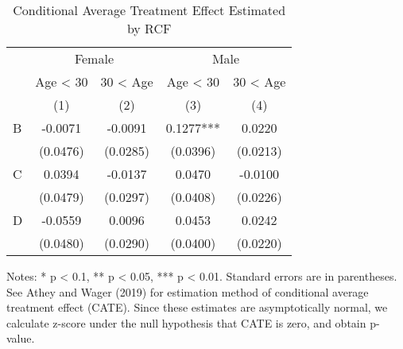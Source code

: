 \documentclass[
]{article}
\begin{document}
\begin{table}[H]

\caption{\label{tab:rcf-int-cate}Conditional Average Treatment Effect Estimated by RCF}
\centering
\fontsize{9}{11}\selectfont
\begin{threeparttable}
\begin{tabular}[t]{lcccc}
\toprule
\multicolumn{1}{c}{ } & \multicolumn{2}{c}{Female} & \multicolumn{2}{c}{Male} \\
\cmidrule(l{3pt}r{3pt}){2-3} \cmidrule(l{3pt}r{3pt}){4-5}
\multicolumn{1}{c}{ } & \multicolumn{1}{c}{Age < 30} & \multicolumn{1}{c}{30 < Age} & \multicolumn{1}{c}{Age < 30} & \multicolumn{1}{c}{30 < Age} \\
\cmidrule(l{3pt}r{3pt}){2-2} \cmidrule(l{3pt}r{3pt}){3-3} \cmidrule(l{3pt}r{3pt}){4-4} \cmidrule(l{3pt}r{3pt}){5-5}
 & (1) & (2) & (3) & (4)\\
\midrule
B & -0.0071 & -0.0091 & 0.1277*** & 0.0220\\
 & (0.0476) & (0.0285) & (0.0396) & (0.0213)\\
C & 0.0394 & -0.0137 & 0.0470 & -0.0100\\
 & (0.0479) & (0.0297) & (0.0408) & (0.0226)\\
D & -0.0559 & 0.0096 & 0.0453 & 0.0242\\
 & (0.0480) & (0.0290) & (0.0400) & (0.0220)\\
\bottomrule
\end{tabular}
\begin{tablenotes}
\item Notes: * p < 0.1, ** p < 0.05, *** p < 0.01. Standard errors are in parentheses. See Athey and Wager (2019) for estimation method of conditional average treatment effect (CATE). Since these estimates are asymptotically normal, we calculate z-score under the null hypothesis that CATE is zero, and obtain p-value. 
\end{tablenotes}
\end{threeparttable}
\end{table}
\end{document}
